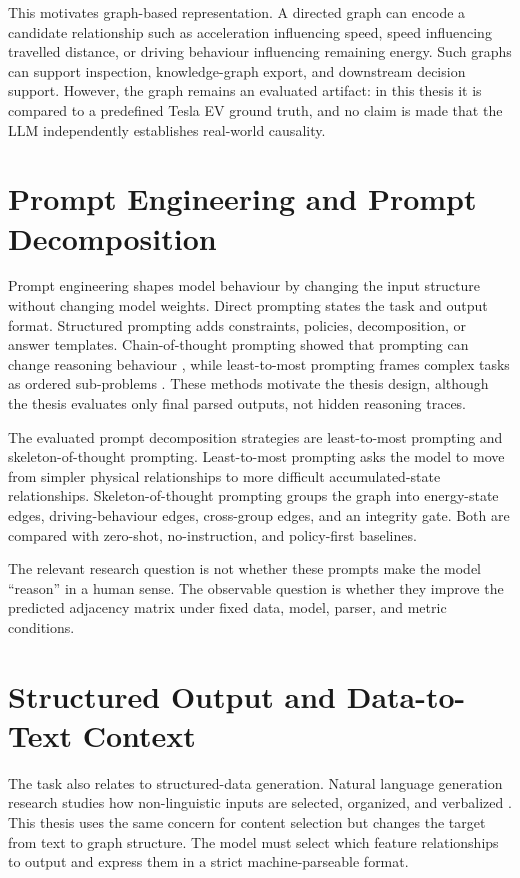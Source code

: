 This motivates graph-based representation. A directed graph can encode a
candidate relationship such as acceleration influencing speed, speed
influencing travelled distance, or driving behaviour influencing remaining
energy. Such graphs can support inspection, knowledge-graph export, and
downstream decision support. However, the graph remains an evaluated artifact:
in this thesis it is compared to a predefined Tesla EV ground truth, and no
claim is made that the LLM independently establishes real-world causality.

\section{Prompt Engineering and Prompt Decomposition}

Prompt engineering shapes model behaviour by changing the input structure
without changing model weights. Direct prompting states the task and output
format. Structured prompting adds constraints, policies, decomposition, or
answer templates. Chain-of-thought prompting showed that prompting can
change reasoning behaviour \parencite{wei2022chain}, while least-to-most
prompting frames complex tasks as ordered sub-problems
\parencite{zhou2023least}. These methods motivate the thesis design, although
the thesis evaluates only final parsed outputs, not hidden reasoning traces.

The evaluated prompt decomposition strategies are least-to-most prompting and
skeleton-of-thought prompting. Least-to-most prompting asks the model to move
from simpler physical relationships to more difficult accumulated-state
relationships. Skeleton-of-thought prompting groups the graph into
energy-state edges, driving-behaviour edges, cross-group edges, and an
integrity gate. Both are compared with zero-shot, no-instruction, and
policy-first baselines.

The relevant research question is not whether these prompts make the model
``reason'' in a human sense. The observable question is whether they improve
the predicted adjacency matrix under fixed data, model, parser, and metric
conditions.

\section{Structured Output and Data-to-Text Context}

The task also relates to structured-data generation. Natural language
generation research studies how non-linguistic inputs are selected,
organized, and verbalized \parencite{gatt2018survey,wiseman2017challenges}.
This thesis uses the same concern for content selection but changes the target
from text to graph structure. The model must select which feature
relationships to output and express them in a strict machine-parseable format.

